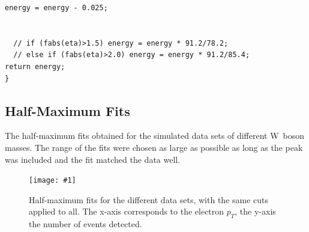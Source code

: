 \documentclass[twocolumn]{article}
\newcommand{\insertFigure}[1]{%
   \texttt{[image: \#1]}%
}
\begin{document}
\begin{lstlisting}
energy = energy - 0.025;


  // if (fabs(eta)>1.5) energy = energy * 91.2/78.2;
  // else if (fabs(eta)>2.0) energy = energy * 91.2/85.4;
return energy;
} 
\end{lstlisting}
\newpage
\subsection{Half-Maximum Fits} \label{sec:half}
The half-maximum fits obtained for the simulated data sets of different W~boson masses. The range of the fits were chosen as large as possible as long as the peak was included and the fit matched the data well.
\begin{figure}[!h]
	\centering
	\insertFigure{Images/GaugeCurves.png}
	\caption{Half-maximum fits for the different data sets, with the same cuts applied to all. The x-axis corresponds to the electron $p_T$, the y-axis the number of events detected.}
	\label{fig:gauge}
\end{figure}
\end{document}
